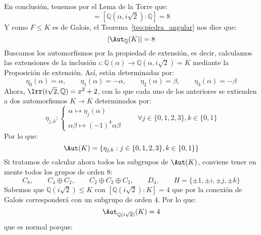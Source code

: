 \begin{ejemplo}
    \noindent
    En conclusión, tenemos por el Lema de la Torre que:
    \begin{equation*}
        [\mathbb{Q}(\alpha,\beta):\mathbb{Q}] = \left[\mathbb{Q}\left(\alpha,i\sqrt{2}\right):\mathbb{Q}\right] = 8
    \end{equation*}
    Y como $F\leq K$ es de Galois, el Teorema~\ref{teo:piedra_angular} nos dice que:
    \begin{equation*}
        |\Aut_{\mathbb{Q}}(K)| = 8
    \end{equation*}
    Buscamos los automorfismos por la propiedad de extensión, es decir, calculamos las extensiones de la inclusión $\iota:\mathbb{Q}(\alpha)\to \mathbb{Q}(\alpha,i\sqrt{2}) = K$ mediante la Proposición de extensión. Así, están determinadas por:
    \begin{equation*}
        \eta_0(\alpha) = \alpha, \qquad \eta_1(\alpha) = -\alpha, \qquad \eta_2(\alpha) = \beta,\qquad \eta_3(\alpha) = -\beta
    \end{equation*}
    Ahora, $\Irr(i\sqrt{2},\mathbb{Q}) = x^2+2$, con lo que cada uno de los anteriores se extienden a dos automorfismos $K\to K$ determinados por:
    \begin{equation*}
        \eta_{j,k} : \left\{\begin{array}{l}
            \alpha\longmapsto \eta_j(\alpha) \\
            \alpha\beta \longmapsto {(-1)}^{k}\alpha\beta
        \end{array}\right. \qquad \forall j \in \{0,1,2,3\}, k \in \{0,1\}
    \end{equation*}
    Por lo que:
    \begin{equation*}
        \Aut(K) = \{\eta_{j,k} : j \in \{0,1,2,3\}, k \in \{0,1\}\}
    \end{equation*}
    Si tratamos de calcular ahora todos los subgrupos de $\Aut(K)$, conviene tener en mente todos los grupos de orden 8:
    \begin{equation*}
        C_8,\qquad  C_4\oplus C_2,\qquad C_2\oplus C_2\oplus C_2, \qquad D_4,\qquad H=\{\pm1,\pm i,\pm j,\pm k\}
    \end{equation*}
    Sabemos que $\mathbb{Q}\left(i\sqrt{2}\right)\leq K$ con $\left[\mathbb{Q}\left(i\sqrt{2}\right):K\right] = 4$ que por la conexión de Galois corresponderá con un subgrupo de orden $4$. Por lo que:
    \begin{equation*}
        \Aut_{\mathbb{Q}(i\sqrt{2})}(K) = 4
    \end{equation*}
    que es normal porque:

\end{ejemplo}
